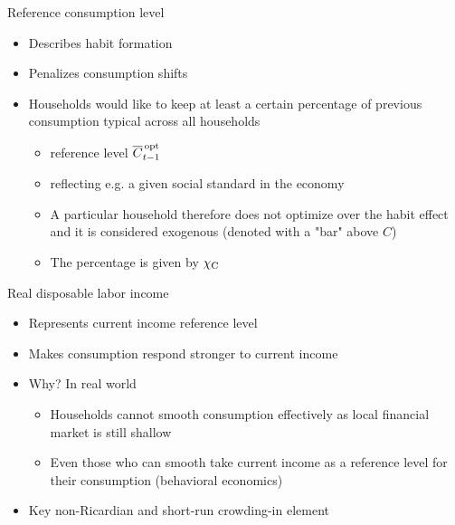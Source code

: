 \begin{frame}{Reference consumption level}
  \vspace{-5mm}
  \begin{itemize}
    \item Describes habit formation
    \item Penalizes consumption shifts 
    \item Households would like to keep at least a certain percentage of previous consumption typical across all households
    \begin{itemize}
      \item reference level $\overline{C}^{\, \text{opt}}_{t-1}$
      \item reflecting e.g. a given social standard in the economy
      \item A particular household therefore does not optimize over the habit effect and it is considered exogenous (denoted with a "bar" above $C$)
      \item The percentage is given by $\chi_\cc$
    \end{itemize}
  \end{itemize} 
  
\end{frame}


\startframecont

\begin{frame}{Real disposable labor income}
  \begin{itemize}
    \item Represents current income reference level
    \item Makes consumption respond stronger to current income
    \item Why? In real world
    \begin{itemize}
      \item Households cannot smooth consumption effectively as local financial market is still shallow
      \item Even those who can smooth take current income as a reference level for their consumption (behavioral economics)
    \end{itemize}
    \item Key non-Ricardian and short-run crowding-in element
  \end{itemize} 
\end{frame}

